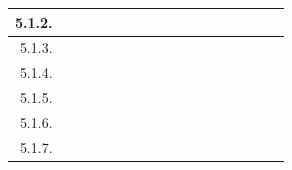 \documentclass[12pt]{article}
\begin{document}
\begin{table}[H]
{\begin{tabular}{|rllllllllllllllll|}
        \multicolumn{1}{|r|}{5.1.2.} & \multicolumn{1}{c|}{\cellcolor[HTML]{B6D7A8}} & \multicolumn{1}{c|}{\cellcolor[HTML]{B6D7A8}} & \multicolumn{1}{l|}{} & \multicolumn{1}{l|}{} & \multicolumn{1}{l|}{} & \multicolumn{1}{l|}{} & \multicolumn{1}{l|}{} & \multicolumn{1}{l|}{} & \multicolumn{1}{l|}{} & \multicolumn{1}{l|}{} & \multicolumn{1}{l|}{} & \multicolumn{1}{l|}{} & \multicolumn{1}{l|}{} & \multicolumn{1}{l|}{} & \multicolumn{1}{l|}{} &  \\ \hline
        \multicolumn{1}{|r|}{5.1.3.} & \multicolumn{1}{l|}{} & \multicolumn{1}{c|}{\cellcolor[HTML]{B6D7A8}} & \multicolumn{1}{c|}{\cellcolor[HTML]{B6D7A8}} & \multicolumn{1}{l|}{} & \multicolumn{1}{l|}{} & \multicolumn{1}{l|}{} & \multicolumn{1}{l|}{} & \multicolumn{1}{l|}{} & \multicolumn{1}{l|}{} & \multicolumn{1}{l|}{} & \multicolumn{1}{l|}{} & \multicolumn{1}{l|}{} & \multicolumn{1}{l|}{} & \multicolumn{1}{l|}{} & \multicolumn{1}{l|}{} &  \\ \hline
        \multicolumn{1}{|r|}{5.1.4.} & \multicolumn{1}{l|}{} & \multicolumn{1}{c|}{\cellcolor[HTML]{B6D7A8}} & \multicolumn{1}{c|}{\cellcolor[HTML]{B6D7A8}} & \multicolumn{1}{l|}{} & \multicolumn{1}{l|}{} & \multicolumn{1}{l|}{} & \multicolumn{1}{l|}{} & \multicolumn{1}{l|}{} & \multicolumn{1}{l|}{} & \multicolumn{1}{l|}{} & \multicolumn{1}{l|}{} & \multicolumn{1}{l|}{} & \multicolumn{1}{l|}{} & \multicolumn{1}{l|}{} & \multicolumn{1}{l|}{} &  \\ \hline
        \multicolumn{1}{|r|}{5.1.5.} & \multicolumn{1}{l|}{} & \multicolumn{1}{c|}{\cellcolor[HTML]{B6D7A8}} & \multicolumn{1}{c|}{\cellcolor[HTML]{B6D7A8}} & \multicolumn{1}{l|}{} & \multicolumn{1}{l|}{} & \multicolumn{1}{l|}{} & \multicolumn{1}{l|}{} & \multicolumn{1}{l|}{} & \multicolumn{1}{l|}{} & \multicolumn{1}{l|}{} & \multicolumn{1}{l|}{} & \multicolumn{1}{l|}{} & \multicolumn{1}{l|}{} & \multicolumn{1}{l|}{} & \multicolumn{1}{l|}{} &  \\ \hline
        \multicolumn{1}{|r|}{5.1.6.} & \multicolumn{1}{c|}{\cellcolor[HTML]{B6D7A8}} & \multicolumn{1}{c|}{\cellcolor[HTML]{B6D7A8}} & \multicolumn{1}{c|}{\cellcolor[HTML]{B6D7A8}} & \multicolumn{1}{c|}{\cellcolor[HTML]{B6D7A8}} & \multicolumn{1}{l|}{} & \multicolumn{1}{l|}{} & \multicolumn{1}{l|}{} & \multicolumn{1}{l|}{} & \multicolumn{1}{l|}{} & \multicolumn{1}{l|}{} & \multicolumn{1}{l|}{} & \multicolumn{1}{l|}{} & \multicolumn{1}{l|}{} & \multicolumn{1}{l|}{} & \multicolumn{1}{l|}{} &  \\ \hline
        \multicolumn{1}{|r|}{5.1.7.} & \multicolumn{1}{l|}{} & \multicolumn{1}{l|}{} & \multicolumn{1}{l|}{} & \multicolumn{1}{c|}{\cellcolor[HTML]{B6D7A8}} & \multicolumn{1}{l|}{} & \multicolumn{1}{l|}{} & \multicolumn{1}{l|}{} & \multicolumn{1}{l|}{} & \multicolumn{1}{l|}{} & \multicolumn{1}{l|}{} & \multicolumn{1}{l|}{} & \multicolumn{1}{l|}{} & \multicolumn{1}{l|}{} & \multicolumn{1}{l|}{} & \multicolumn{1}{l|}{} &  \\ \hline

\end{tabular}}
\end{table}
\end{document}
